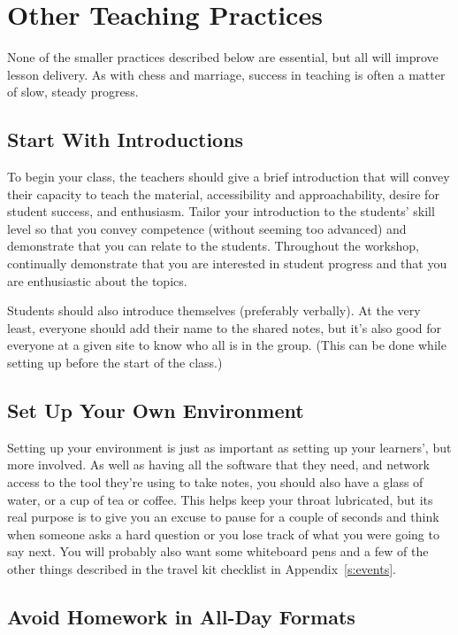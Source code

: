 \section{Other Teaching Practices}\label{s:classroom-practices}

None of the smaller practices described below are essential, but all
will improve lesson delivery. As with chess and marriage, success in
teaching is often a matter of slow, steady progress.

\subsection{Start With Introductions}\label{start-with-introductions}

To begin your class, the teachers should give a brief introduction that
will convey their capacity to teach the material, accessibility and
approachability, desire for student success, and enthusiasm. Tailor your
introduction to the students' skill level so that you convey competence
(without seeming too advanced) and demonstrate that you can relate to
the students. Throughout the workshop, continually demonstrate that you
are interested in student progress and that you are enthusiastic about
the topics.

Students should also introduce themselves (preferably verbally). At the
very least, everyone should add their name to the shared notes, but it's
also good for everyone at a given site to know who all is in the group.
(This can be done while setting up before the start of the class.)

\subsection{Set Up Your Own Environment}\label{set-up-your-own-environment}

Setting up your environment is just as important as setting up your
learners', but more involved. As well as having all the software that
they need, and network access to the tool they're using to take notes,
you should also have a glass of water, or a cup of tea or coffee. This
helps keep your throat lubricated, but its real purpose is to give you
an excuse to pause for a couple of seconds and think when someone asks a
hard question or you lose track of what you were going to say next. You
will probably also want some whiteboard pens and a few of the other
things described in the travel kit checklist in Appendix~\ref{s:events}.

\subsection{Avoid Homework in All-Day Formats}\label{avoid-homework-in-all-day-formats}

